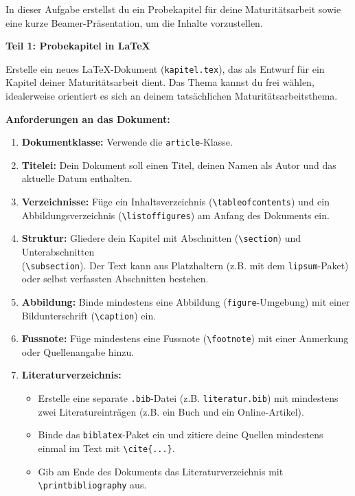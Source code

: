 \clearpage

\begin{myexercise}
	In dieser Aufgabe erstellst du ein Probekapitel für deine Maturitätsarbeit sowie eine kurze Beamer-Präsentation, um die Inhalte vorzustellen.

	\textbf{Teil 1: Probekapitel in \LaTeX}

	Erstelle ein neues \LaTeX-Dokument (\lstinline|kapitel.tex|), das als Entwurf für ein Kapitel deiner Maturitätsarbeit dient. Das Thema kannst du frei wählen, idealerweise orientiert es sich an deinem tatsächlichen Maturitätsarbeitsthema.

	\textbf{Anforderungen an das Dokument:}
	\begin{enumerate}
		\item \textbf{Dokumentklasse:} Verwende die \lstinline|article|-Klasse.
		\item \textbf{Titelei:} Dein Dokument soll einen Titel, deinen Namen als Autor und das aktuelle Datum enthalten.
		\item \textbf{Verzeichnisse:} Füge ein Inhaltsverzeichnis (\lstinline|\tableofcontents|) und ein Abbildungsverzeichnis (\lstinline|\listoffigures|) am Anfang des Dokuments ein.
		\item \textbf{Struktur:} Gliedere dein Kapitel mit Abschnitten (\lstinline|\section|) und Unterabschnitten\\ (\lstinline|\subsection|). Der Text kann aus Platzhaltern (z.B. mit dem \lstinline|lipsum|-Paket) oder selbst verfassten Abschnitten bestehen.
		\item \textbf{Abbildung:} Binde mindestens eine Abbildung (\lstinline|figure|-Umgebung) mit einer Bildunterschrift (\lstinline|\caption|) ein.
		\item \textbf{Fussnote:} Füge mindestens eine Fussnote (\lstinline|\footnote|) mit einer Anmerkung oder Quellenangabe hinzu.
		\item \textbf{Literaturverzeichnis:}
		      \begin{itemize}
			      \item Erstelle eine separate \lstinline|.bib|-Datei (z.B. \lstinline|literatur.bib|) mit mindestens zwei Literatureinträgen (z.B. ein Buch und ein Online-Artikel).
			      \item Binde das \lstinline|biblatex|-Paket ein und zitiere deine Quellen mindestens einmal im Text mit \lstinline|\cite{...}|.
			      \item Gib am Ende des Dokuments das Literaturverzeichnis mit \lstinline|\printbibliography| aus.
		      \end{itemize}
	\end{enumerate}


\end{myexercise}
